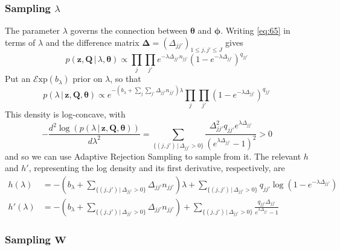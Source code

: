 \documentclass[12pt,letterpaper]{report}
\newcommand{\Exp}[1]{\mathcal{E}\mathrm{xp}(#1)}
\newcommand{\given}{\, \vert \,}
\newcommand{\bQ}{\mathbf{Q}}
\newcommand{\bz}{\mathbf{z}}
\newcommand{\bW}{\mathbf{W}}
\newcommand{\btheta}{\boldsymbol{\theta}}
\newcommand{\bphi}{\boldsymbol{\phi}}
\begin{document}
\subsubsection{Sampling $\lambda$}
\label{sec:sampling-lambda}

The parameter $\lambda$ governs the connection between $\btheta$ and
$\bphi$.  Writing \eqref{eq:65} in terms of $\lambda$ and the difference matrix
$\boldsymbol{\Delta} = (\Delta_{jj'})_{1 \leq j,j' \leq J}$ gives
\begin{equation}
  \label{eq:88}
  p(\bz, \bQ \given \lambda, \btheta) \propto \prod_{j}\prod_{j'}
  e^{-\lambda \Delta_{jj'} n_{jj'}}(1-e^{-\lambda\Delta_{jj'}})^{q_{jj'}} 
\end{equation}
Put an $\Exp{b_{\lambda}}$ prior on $\lambda$, so that
\begin{equation}
  \label{eq:88}
  p(\lambda \given \bz, \bQ, \btheta) \propto
  e^{-(b_{\lambda} + \sum_{j}\sum_{j'} \Delta_{jj'} n_{jj'})\lambda} \prod_{j}\prod_{j'}
  (1-e^{-\lambda\Delta_{jj'}})^{q_{jj'}}
\end{equation}
This density is log-concave, with
\begin{equation}
  \label{eq:90}
  -\frac{d^2\log(p(\lambda \given \bz, \bQ,
    \btheta))}{d\lambda^2} = \sum_{\{(j,j') \given
    \Delta_{jj'} > 0\}}
  \frac{\Delta_{jj'}^2 q_{jj'}
    e^{\lambda\Delta_{jj'}}}{(e^{\lambda\Delta_{jj'}} - 1)^2} > 0
\end{equation}
and so we can use Adaptive Rejection Sampling \citep{gilks1992adaptive}
to sample from it.  The relevant $h$ and $h'$, representing the log
density and its first derivative, respectively, are
\begin{align}
  \label{eq:94}
  h(\lambda) &= 
  -(b_{\lambda} + \sum_{\{(j,j') \given \Delta_{jj'} > 0\}} \Delta_{jj'} n_{jj'})\lambda +
  \sum_{\{(j,j') \given \Delta_{jj'} > 0\}} q_{jj'} \log(1 - e^{-\lambda\Delta_{jj'}}) \\
  h'(\lambda) &= -(b_{\lambda} + \sum_{\{(j,j') \given \Delta_{jj'} > 0\}} \Delta_{jj'}
  n_{jj'}) + \sum_{\{(j,j') \given \Delta_{jj'} > 0\}}
  \frac{q_{jj'}\Delta_{jj'}}{e^{\lambda\Delta_{jj'}} - 1}
\end{align}

\subsubsection{Sampling $\bW$}
\end{document}
